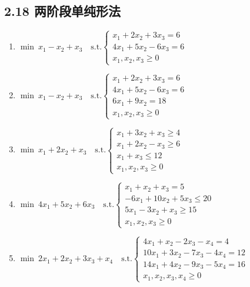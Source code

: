 \documentclass{article}
\begin{document}
\subsection*{2.18 两阶段单纯形法}
\begin{enumerate}
    \item $\min\ x_1 - x_2 + x_3 \quad \text{s.t.} \begin{cases} x_1 + 2x_2 + 3x_3 = 6 \\ 4x_1 + 5x_2 - 6x_3 = 6 \\ x_1, x_2, x_3 \ge 0 \end{cases}$
    \item $\min\ x_1 - x_2 + x_3 \quad \text{s.t.} \begin{cases} x_1 + 2x_2 + 3x_3 = 6 \\ 4x_1 + 5x_2 - 6x_3 = 6 \\ 6x_1 + 9x_2 = 18 \\ x_1, x_2, x_3 \ge 0 \end{cases}$
    \item $\min\ x_1 + 2x_2 + x_3 \quad \text{s.t.} \begin{cases} x_1 + 3x_2 + x_3 \ge 4 \\ x_1 + 2x_2 - x_3 \ge 6 \\ x_1 + x_3 \le 12 \\ x_1, x_2, x_3 \ge 0 \end{cases}$
    \item $\min\ 4x_1 + 5x_2 + 6x_3 \quad \text{s.t.} \begin{cases} x_1 + x_2 + x_3 = 5 \\ -6x_1 + 10x_2 + 5x_3 \le 20 \\ 5x_1 - 3x_2 + x_3 \ge 15 \\ x_1, x_2, x_3 \ge 0 \end{cases}$
    \item $\min\ 2x_1 + 2x_2 + 3x_3 + x_4 \quad \text{s.t.} \begin{cases} 4x_1 + x_2 - 2x_3 - x_4 = 4 \\ 10x_1 + 3x_2 - 7x_3 - 4x_4 = 12 \\ 14x_1 + 4x_2 - 9x_3 - 5x_4 = 16 \\ x_1, x_2, x_3, x_4 \ge 0 \end{cases}$
\end{enumerate}
\end{document}
